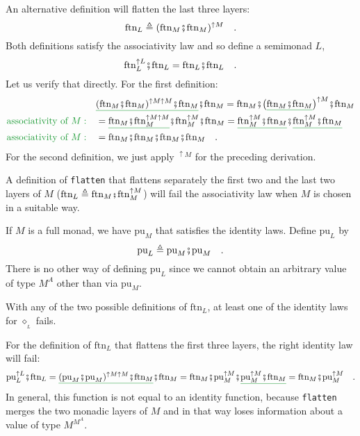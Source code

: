 An alternative definition will flatten the last three layers:
\[
\text{ftn}_{L}\triangleq(\text{ftn}_{M}\bef\text{ftn}_{M})^{\uparrow M}\quad.
\]
Both definitions satisfy the associativity law and so define a semimonad
$L$,
\[
\text{ftn}_{L}^{\uparrow L}\bef\text{ftn}_{L}=\text{ftn}_{L}\bef\text{ftn}_{L}\quad.
\]
Let us verify that directly. For the first definition:
\begin{align*}
 & \gunderline{(\text{ftn}_{M}\bef\text{ftn}_{M})^{\uparrow M\uparrow M}\bef\text{ftn}_{M}}\bef\text{ftn}_{M}=\text{ftn}_{M}\bef\big(\gunderline{\text{ftn}_{M}\bef\text{ftn}_{M}}\big)^{\uparrow M}\bef\text{ftn}_{M}\\
{\color{greenunder}\text{associativity of }M:}\quad & =\gunderline{\text{ftn}_{M}\bef\text{ftn}_{M}^{\uparrow M\uparrow M}}\bef\text{ftn}_{M}^{\uparrow M}\bef\text{ftn}_{M}=\gunderline{\text{ftn}_{M}^{\uparrow M}\bef\text{ftn}_{M}}\bef\gunderline{\text{ftn}_{M}^{\uparrow M}\bef\text{ftn}_{M}}\\
{\color{greenunder}\text{associativity of }M:}\quad & =\text{ftn}_{M}\bef\text{ftn}_{M}\bef\text{ftn}_{M}\bef\text{ftn}_{M}\quad.
\end{align*}
For the second definition, we just apply $^{\uparrow M}$ for the
preceding derivation.

A definition of \lstinline!flatten! that flattens separately the
first two and the last two layers of $M$ ($\text{ftn}_{L}\triangleq\text{ftn}_{M}\bef\text{ftn}_{M}^{\uparrow M}$)
will fail the associativity law when $M$ is chosen in a suitable
way.

If $M$ is a full monad, we have $\text{pu}_{M}$ that satisfies the
identity laws. Define $\text{pu}_{L}$ by
\[
\text{pu}_{L}\triangleq\text{pu}_{M}\bef\text{pu}_{M}\quad.
\]
There is no other way of defining $\text{pu}_{L}$ since we cannot
obtain an arbitrary value of type $M^{A}$ other than via $\text{pu}_{M}$.

With any of the two possible definitions of $\text{ftn}_{L}$, at
least one of the identity laws for $\diamond_{_{L}}$ fails.

For the definition of $\text{ftn}_{L}$ that flattens the first three
layers, the right identity law will fail:
\[
\text{pu}_{L}^{\uparrow L}\bef\text{ftn}_{L}=\gunderline{(\text{pu}_{M}\bef\text{pu}_{M})^{\uparrow M\uparrow M}\bef\text{ftn}_{M}}\bef\text{ftn}_{M}=\text{ftn}_{M}\bef\text{pu}_{M}^{\uparrow M}\bef\gunderline{\text{pu}_{M}^{\uparrow M}\bef\text{ftn}_{M}}=\text{ftn}_{M}\bef\text{pu}_{M}^{\uparrow M}\quad.
\]
In general, this function is not equal to an identity function, because
\lstinline!flatten! merges the two monadic layers of $M$ and in
that way loses information about a value of type $M^{M^{A}}$.

